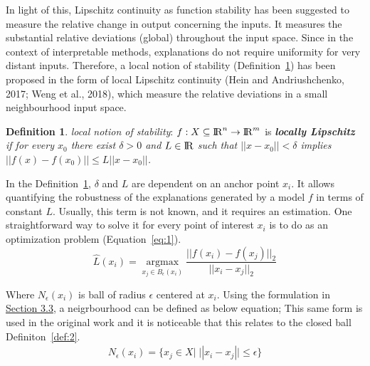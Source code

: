 \documentclass[english]{tktltiki2}
\theoremstyle{definition}
\newtheorem{definition}[thm]{Definition}
\theoremstyle{remark}
\begin{document}
In light of this, Lipschitz continuity as function stability has been suggested to measure the relative change in output concerning the inputs. It measures the substantial relative deviations (global) throughout the input space. Since in the context of interpretable methods, explanations do not require uniformity for very distant inputs. Therefore, a local notion of stability (Definition~\ref{def:3}) has been proposed in the form of local Lipschitz continuity (Hein and Andriushchenko, 2017; Weng et al., 2018), which measure the relative deviations in a small neighbourhood input space.
\begin{definition}\label{def:3}{\textit{local notion of stability}:}
	$f: X \subseteq {\rm I\!R}^n \rightarrow {\rm I\!R}^m$ is \textbf{\textit{locally Lipschitz}} \textit{if for every $x_0$ there exist $\delta > 0$ and $L \in {\rm I\!R}$ such that $||x - x_0|| < \delta$ implies $||f(x) - f(x_0)|| \leq L||x - x_0||$.}
\end{definition}

In the Definition~\ref{def:3}, $\delta$ and $L$ are dependent on an anchor point $x_i$. It allows quantifying the robustness of the explanations generated by a model $f$ in terms of constant $L$. Usually, this term is not known, and it requires an estimation. One straightforward way to solve it for every point of interest $x_i$ is to do as an optimization problem (Equation~\ref{eq:1}).
\begin{equation}\label{eq:1}
\hat{L}(x_i) = \operatorname*{argmax}_{x_j \in B_{\epsilon}(x_i)}  \frac{||f(x_i) - f(x_j)||_{2}}{||x_i - x_j||_{2}}
\end{equation}

Where $N_{\epsilon}(x_{i})$ is ball of radius $\epsilon$ centered at $x_i$. Using the formulation in \hyperref[sec:defining_similarity]{Section 3.3}, a neigrbourhood can be defined as below equation; This same form is used in the original work \citep{alvarez2018robustness} and it is noticeable that this relates to the closed ball Definiton~\ref{def:2}.
\begin{align*}
N_{\epsilon}(x_i) = \{x_j \in X|\;||x_i - x_j|| \leq \epsilon\}
\end{align*}  
\end{document}
